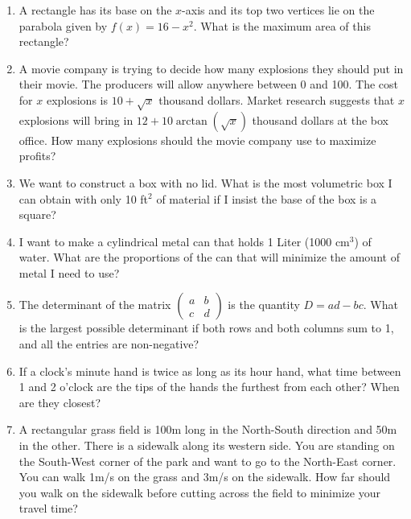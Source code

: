 \documentclass{article}
\newcommand{\R}{\mathbb{R}}
\begin{document}
\begin{enumerate}
\item A rectangle has its base on the $x$-axis and its top two vertices lie on the parabola given by $f(x)=16-x^2$. What is the maximum area of this rectangle?
\item A movie company is trying to decide how many explosions they should put in their movie. The producers will allow anywhere between 0 and 100. The cost for $x$ explosions is $10+\sqrt{x}$ thousand dollars. Market research suggests that $x$ explosions will bring in $12+10\arctan(\sqrt{x})$ thousand dollars at the box office. How many explosions should the movie company use to maximize profits?
\item We want to construct a box with no lid. What is the most volumetric box I can obtain with only 10 ft$^2$ of material if I insist the base of the box is a square?
\item I want to make a cylindrical metal can that holds 1 Liter (1000 cm$^3$) of water. What are the proportions of the can that will minimize the amount of metal I need to use?
\item The determinant of the matrix $\begin{pmatrix}a & b \\ c & d\end{pmatrix}$ is the quantity $D=ad-bc$. What is the largest possible determinant if both rows and both columns sum to 1, and all the entries are non-negative?
\item If a clock's minute hand is twice as long as its hour hand, what time between 1 and 2 o'clock are the tips of the hands the furthest from each other? When are they closest?
\item A rectangular grass field is 100m long in the North-South direction and 50m in the other. There is a sidewalk along its western side. You are standing on the South-West corner of the park and want to go to the North-East corner. You can walk 1m/s on the grass and 3m/s on the sidewalk. How far should you walk on the sidewalk before cutting across the field to minimize your travel time?
\end{enumerate}






\newpage




\end{document}
